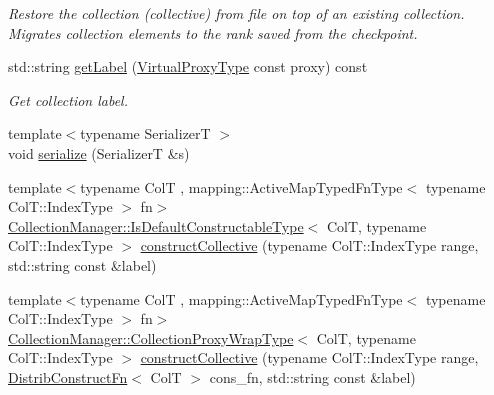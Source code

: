 \begin{DoxyCompactItemize}
\begin{DoxyCompactList}\small\item\em Restore the collection (collective) from file on top of an existing collection. Migrates collection elements to the rank saved from the checkpoint. \end{DoxyCompactList}\item 
std\+::string \hyperlink{structvt_1_1vrt_1_1collection_1_1_collection_manager_a87b3cd902f7124eb9acd92dbc5895121}{get\+Label} (\hyperlink{namespacevt_a1b417dd5d684f045bb58a0ede70045ac}{Virtual\+Proxy\+Type} const proxy) const
\begin{DoxyCompactList}\small\item\em Get collection label. \end{DoxyCompactList}\item 
{\footnotesize template$<$typename SerializerT $>$ }\\void \hyperlink{structvt_1_1vrt_1_1collection_1_1_collection_manager_af9101933d9e9ca9aa0b6b1f39edbb9f0}{serialize} (SerializerT \&s)
\item 
{\footnotesize template$<$typename ColT , mapping\+::\+Active\+Map\+Typed\+Fn\+Type$<$ typename Col\+T\+::\+Index\+Type $>$ fn$>$ }\\\hyperlink{structvt_1_1vrt_1_1collection_1_1_collection_manager_af8091fcb8218dad155ea028c9b5d283f}{Collection\+Manager\+::\+Is\+Default\+Constructable\+Type}$<$ ColT, typename Col\+T\+::\+Index\+Type $>$ \hyperlink{structvt_1_1vrt_1_1collection_1_1_collection_manager_acc57a9d8e4c2354a50075e1a68ffc796}{construct\+Collective} (typename Col\+T\+::\+Index\+Type range, std\+::string const \&label)
\item 
{\footnotesize template$<$typename ColT , mapping\+::\+Active\+Map\+Typed\+Fn\+Type$<$ typename Col\+T\+::\+Index\+Type $>$ fn$>$ }\\\hyperlink{structvt_1_1vrt_1_1collection_1_1_collection_manager_a56458ed7f9bb22b631b9b3a745f42f94}{Collection\+Manager\+::\+Collection\+Proxy\+Wrap\+Type}$<$ ColT, typename Col\+T\+::\+Index\+Type $>$ \hyperlink{structvt_1_1vrt_1_1collection_1_1_collection_manager_a382237a66371d8d228a04d92e068810c}{construct\+Collective} (typename Col\+T\+::\+Index\+Type range, \hyperlink{structvt_1_1vrt_1_1collection_1_1_collection_manager_a9ef5ab71e344fdee8525c3f18241c305}{Distrib\+Construct\+Fn}$<$ ColT $>$ cons\+\_\+fn, std\+::string const \&label)
\end{DoxyCompactItemize}
